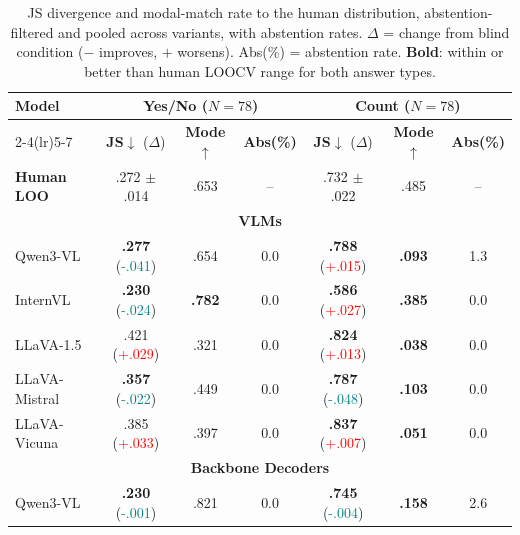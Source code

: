 \begin{table}[t]
\centering
\small
\setlength{\tabcolsep}{4pt}
\renewcommand{\arraystretch}{0.95}

\caption{JS divergence and modal-match rate to the human distribution, abstention-filtered and pooled across variants, with abstention rates. $\Delta$ = change from blind condition ($-$ improves, $+$ worsens). Abs(\%) = abstention rate. \textbf{Bold}: within or better than human LOOCV range for both answer types.}
\label{tab:hm_grouped_distribution_7b_compact_filtered_abst}
\begin{tabular}{lccc@{\hspace{8pt}}ccc}
\toprule
\multirow{2}{*}{\textbf{Model}} &
\multicolumn{3}{c}{\textbf{Yes/No} \scriptsize($N{=}78$)} &
\multicolumn{3}{c}{\textbf{Count} \scriptsize($N{=}78$)} \\
\cmidrule(lr){2-4}\cmidrule(lr){5-7}
& \textbf{JS}$\downarrow$ ($\Delta$) & \textbf{Mode}$\uparrow$ & \textbf{Abs(\%)} & \textbf{JS}$\downarrow$ ($\Delta$) & \textbf{Mode}$\uparrow$ & \textbf{Abs(\%)} \\
\midrule
\textbf{Human LOO} & .272 {\scriptsize $\pm$.014} & .653 & -- & .732 {\scriptsize $\pm$.022} & .485 & -- \\
\midrule
\multicolumn{7}{c}{\textbf{VLMs}} \\
\midrule
Qwen3-VL      & \textbf{.277} {\scriptsize (\textcolor{teal}{-.041})} & .654 & 0.0 & \textbf{.788} {\scriptsize (\textcolor{red}{+.015})} & \textbf{.093} & 1.3 \\
InternVL      & \textbf{.230} {\scriptsize (\textcolor{teal}{-.024})} & \textbf{.782} & 0.0 & \textbf{.586} {\scriptsize (\textcolor{red}{+.027})} & \textbf{.385} & 0.0 \\
LLaVA-1.5     & .421 {\scriptsize (\textcolor{red}{+.029})} & .321 & 0.0 & \textbf{.824} {\scriptsize (\textcolor{red}{+.013})} & \textbf{.038} & 0.0 \\
LLaVA-Mistral & \textbf{.357} {\scriptsize (\textcolor{teal}{-.022})} & .449 & 0.0 & \textbf{.787} {\scriptsize (\textcolor{teal}{-.048})} & \textbf{.103} & 0.0 \\
LLaVA-Vicuna  & .385 {\scriptsize (\textcolor{red}{+.033})} & .397 & 0.0 & \textbf{.837} {\scriptsize (\textcolor{red}{+.007})} & \textbf{.051} & 0.0 \\
\midrule
\multicolumn{7}{c}{\textbf{Backbone Decoders}} \\
\midrule
Qwen3-VL      & \textbf{.230} {\scriptsize (\textcolor{teal}{-.001})} & .821 & 0.0 & \textbf{.745} {\scriptsize (\textcolor{teal}{-.004})} & \textbf{.158} & 2.6 \\

\end{tabular}
\end{table}
